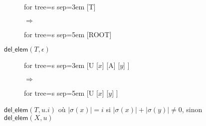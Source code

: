 \begin{figure}[H]
	\centering
	\begin{subfigure}{0.4\textwidth}
		\centering
		\begin{adjustbox}{valign=c, max width=\textwidth}
			\begin{forest}
			for tree={s sep=3em}
			[T]
			\end{forest}
		\end{adjustbox}
		\caption{}
	\end{subfigure}
	\begin{subfigure}{0.1\textwidth}
		\centering
		\huge{$\Rightarrow$}
	\end{subfigure}
	\begin{subfigure}{0.4\textwidth}
		\centering
		\begin{adjustbox}{valign=c, max width=\textwidth}
			\begin{forest}
			for tree={s sep=5em}
			[ROOT]
			\end{forest}
		\end{adjustbox}
		\caption{}
	\end{subfigure}
	\caption{$\textsf{del\_elem}(T, \epsilon)$}
	\label{fig:sch:op:insElem}
\end{figure}


\begin{figure}[H]
	\centering
	\begin{subfigure}{0.4\textwidth}
		\centering
		\begin{adjustbox}{valign=c, max width=\textwidth}
			\begin{forest}
			for tree={s sep=3em}
			[U
				[$x$]
				[A]
				[$y$]
			]
			\end{forest}
		\end{adjustbox}
		\caption{}
	\end{subfigure}
	\begin{subfigure}{0.1\textwidth}
		\centering
		\huge{$\Rightarrow$}
	\end{subfigure}
	\begin{subfigure}{0.4\textwidth}
		\centering
		\begin{adjustbox}{valign=c, max width=\textwidth}
			\begin{forest}
			for tree={s sep=5em}
			[U
				[$x$]
				[$y$]
			]
			\end{forest}
		\end{adjustbox}
		\caption{}
	\end{subfigure}
	\caption{$\textsf{del\_elem}(T, u.i)$ où $|\sigma(x)| = i$ si $|\sigma(x)| + |\sigma(y)| \neq 0$, sinon $\textsf{del\_elem}(X, u)$}
	\label{fig:sch:op:insElem}
\end{figure}



